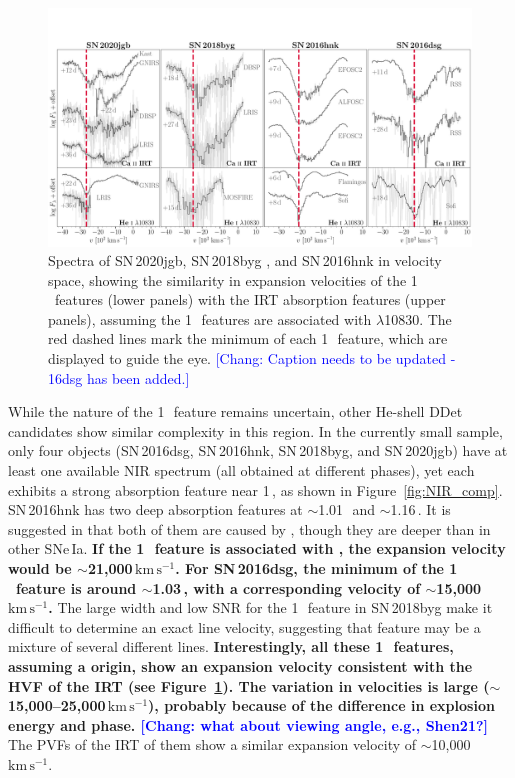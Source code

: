 \documentclass[twocolumn]{aastex631}
\newcommand{\sn}{SN\,2020jgb}
\newcommand{\kms}{$\mathrm{km}\,\mathrm{s}^{-1}$}
\newcommand{\chang}[1]{\textcolor{blue}{[Chang: #1]}}
\newcommand{\revise}[1]{\textbf{#1}}
\begin{document}
\begin{figure}
    \centering
    \includegraphics[width=\textwidth]{CaII_HeI_hvf.pdf}
    \caption{Spectra of \sn, SN\,2018byg \citep{de_18byg_2019}, and SN\,2016hnk \citep{galbany_16hnk_2019} in velocity space, showing the similarity in expansion velocities of the 1\,\micron\ features (lower panels) with the  IRT absorption features (upper panels), assuming the 1\,\micron\ features are associated with  $\lambda$10830. The red dashed lines mark the minimum of each 1\,\micron\ feature, which are displayed to guide the eye. \chang{Caption needs to be updated - 16dsg has been added.}}
    \label{fig:hvf_comp}
\end{figure}

While the nature of the 1\,\micron\ feature remains uncertain, other He-shell DDet candidates show similar complexity in this region. In the currently small sample, only four objects (SN\,2016dsg, SN\,2016hnk, SN\,2018byg, and \sn) have at least one available NIR spectrum (all obtained at different phases), yet each exhibits a strong absorption feature near 1\,\micron, as shown in Figure~\ref{fig:NIR_comp}. SN\,2016hnk has two deep absorption features at $\sim$1.01\,\micron\ and $\sim$1.16\,\micron. It is suggested in \citet{galbany_16hnk_2019} that both of them are caused by , though they are deeper than in other SNe\,Ia. \revise{If the 1\,\micron\ feature is associated with \ion{He}{1}, the expansion velocity would be $\sim$21,000\,\kms. For SN\,2016dsg, the minimum of the 1\,\micron\ feature is around $\sim$1.03\,\micron, with a corresponding velocity of $\sim$15,000\,\kms.} The large width and low SNR for the 1\,\micron\ feature in SN\,2018byg make it difficult to determine an exact line velocity, suggesting that feature may be a mixture of several different lines. \revise{Interestingly, all these 1\,\micron\ features, assuming a \ion{He}{1} origin, show an expansion velocity consistent with the HVF of the \ion{Ca}{2} IRT (see Figure~\ref{fig:hvf_comp}). The variation in \ion{Ca}{2} velocities is large ($\sim$15,000--25,000\,\kms), probably because of the difference in explosion energy and phase. \chang{what about viewing angle, e.g., Shen21?}} The PVFs of the  IRT of them show a similar expansion velocity of $\sim$10,000\,\kms. 
\end{document}

